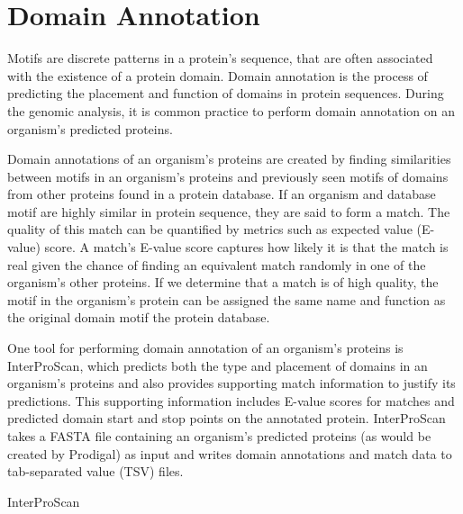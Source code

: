 \section{Domain Annotation}

Motifs are discrete patterns in a protein's sequence, that are often associated with the existence of a protein domain. Domain annotation is the process of predicting the placement and function of domains in protein sequences. During the genomic analysis, it is common practice to perform domain annotation on an organism's predicted proteins.

Domain annotations of an organism's proteins are created by finding similarities between motifs in an organism's proteins and previously seen motifs of domains from other proteins found in a protein database. If an organism and database motif are highly similar in protein sequence, they are said to form a match. The quality of this match can be quantified by metrics such as expected value (E-value) score. A match's E-value score captures how likely it is that the match is real given the chance of finding an equivalent match randomly in one of the organism's other proteins. If we determine that a match is of high quality, the motif in the organism's protein can be assigned the same name and function as the original domain motif the protein database.

One tool for performing domain annotation of an organism's proteins is InterProScan, which predicts both the type and placement of domains in an organism's proteins and also provides supporting match information to justify its predictions. This supporting information includes E-value scores for matches and predicted domain start and stop points on the annotated protein. InterProScan takes a FASTA file \cite{pearson19905} containing an organism's predicted proteins (as would be created by Prodigal) as input and writes domain annotations and match data to tab-separated value (TSV) files.

InterProScan 
